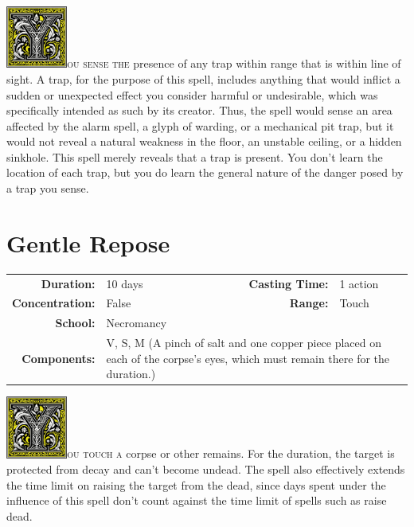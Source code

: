 \documentclass[12pt,showtrims]{memoir}
\begin{document}
\vspace{1\baselineskip}\noindent
\lettrine[lines=4]{\includegraphics[height=58pt]{initials/Y.png}}{ou sense the} presence of any trap within range that is within line of sight. A trap, for the purpose of this spell, includes anything that would inflict a sudden or unexpected effect you consider harmful or undesirable, which was specifically intended as such by its creator. Thus, the spell would sense an area affected by the alarm spell, a glyph of warding, or a mechanical pit trap, but it would not reveal a natural weakness in the floor, an unstable ceiling, or a hidden sinkhole. This spell merely reveals that a trap is present. You don't learn the location of each trap, but you do learn the general nature of the danger posed by a trap you sense.

\newpage
\section*{Gentle Repose}

{
\small\centering\vspace{-6pt}
\begin{tabular}{rlrl}
\toprule

\textbf{Duration:} & 10 days &
\textbf{Casting Time:} & 1 action \\
\textbf{Concentration:} & False &
\textbf{Range:} & Touch \\
\textbf{School:} & Necromancy \\
\textbf{Components:} & \multicolumn{3}{p{0.7\textwidth}}{V, S, M (A pinch of salt and one copper piece placed on each of the corpse's eyes, which must remain there for the duration.)}\\

\bottomrule
\end{tabular}
}

\vspace{1\baselineskip}\noindent 
\lettrine[lines=4]{\includegraphics[height=58pt]{initials/Y.png}}{ou touch a} corpse or other remains. For the duration, the target is protected from decay and can't become undead. The spell also effectively extends the time limit on raising the target from the dead, since days spent under the influence of this spell don't count against the time limit of spells such as raise dead.
\end{document}

